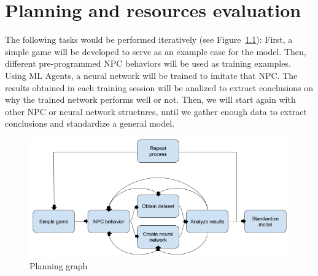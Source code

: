 %
%
%

\chapter{Planning and resources evaluation}

\minitoc{}

\bigskip{}

The following tasks would be performed iteratively (see Figure~\ref{fig:tasks}):
First, a simple game will be developed to serve as an example case for the model. 
Then, different pre-programmed NPC behaviors will be used as training examples. Using ML Agents, a neural network will be trained to imitate that NPC. The results obtained in each training session will be analized to extract conclusions on why the trained network performs well or not. Then, we will start again with other NPC or neural network structures, until we gather enough data to extract conclusions and standardize a general model.

\begin{figure}
  \centering
		\includegraphics[width=.9\textwidth]{img/taskGraph.png}
  \caption{Planning graph}
  \label{fig:tasks}
\end{figure}

